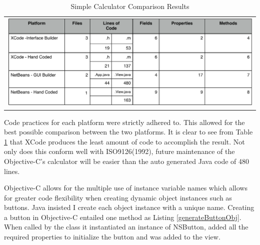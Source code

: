\documentclass[a4paper,14pt]{article}
\begin{document}
\begin{table}[H]
\centering
\begin{tabular}{l}
\includegraphics[scale=0.6]{FileComparisons.pdf}
\end{tabular}
\caption{Simple Calculator Comparison Results}
\label{table:calccompare}
\end{table}
Code practices for each platform were strictly adhered to. This allowed for the best possible comparison between the two platforms. It is clear to see from Table \ref{table:calccompare} that XCode produces the least amount of code to accomplish the result. Not only does this conform well with ISO9126(1992), future maintenance of the Objective-C's calculator will be easier than the auto generated Java code of 480 lines.

Objective-C allows for the multiple use of instance variable names which allows for greater code flexibility when creating dynamic object instances such as buttons. Java insisted I create each object instance with a unique name. 
Creating a button in Objective-C entailed one method as Listing \ref{generateButtonObj}. When called by the class it instantiated an instance of NSButton, added all the required properties to initialize the button and was added to the view.
 
\end{document}
